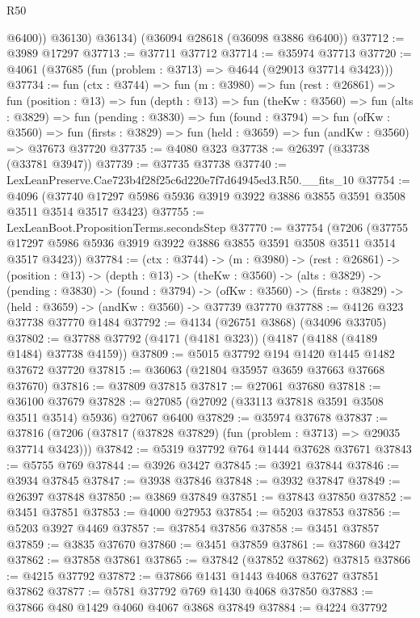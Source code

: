 \begin{lexlean}{R50}
\begin{coremodule}
            @6400))
        @36130)
      @36134)
    (@36094 @28618 (@36098 @3886 @6400))
@37712 := @3989 @17297
@37713 := @37711 @37712
@37714 := @35974 @37713
@37720 := @4061 (@37685 (fun (problem : @3713) => @4644 (@29013 @37714 @3423)))
@37734 := fun (ctx : @3744) =>
  fun (m : @3980) =>
  fun (rest : @26861) =>
  fun (position : @13) =>
  fun (depth : @13) =>
  fun (theKw : @3560) =>
  fun (alts : @3829) =>
  fun (pending : @3830) =>
  fun (found : @3794) =>
  fun (ofKw : @3560) =>
  fun (firsts : @3829) => fun (held : @3659) => fun (andKw : @3560) => @37673 @37720
@37735 := @4080 @323
@37738 := @26397 (@33738 (@33781 @3947))
@37739 := @37735 @37738
@37740 := LexLeanPreserve.Cae723b4f28f25c6d220e7f7d64945ed3.R50.__fits_10
@37754 := @4096
    (@37740 @17297 @5986 @5936 @3919 @3922 @3886 @3855 @3591 @3508 @3511 @3514 @3517 @3423)
@37755 := LexLeanBoot.PropositionTerms.secondsStep
@37770 := @37754
    (@7206 (@37755 @17297 @5986 @5936 @3919 @3922 @3886 @3855 @3591 @3508 @3511 @3514 @3517 @3423))
@37784 := (ctx : @3744) ->
  (m : @3980) ->
  (rest : @26861) ->
  (position : @13) ->
  (depth : @13) ->
  (theKw : @3560) ->
  (alts : @3829) ->
  (pending : @3830) ->
  (found : @3794) ->
  (ofKw : @3560) -> (firsts : @3829) -> (held : @3659) -> (andKw : @3560) -> @37739 @37770
@37788 := @4126 @323 @37738 @37770 @1484
@37792 := @4134 (@26751 @3868) (@34096 @33705)
@37802 := @37788 @37792 (@4171 (@4181 @323)) (@4187 (@4188 (@4189 @1484) @37738 @4159))
@37809 := @5015 @37792 @194 @1420 @1445 @1482 @37672 @37720
@37815 := @36063 (@21804 @35957 @3659 @37663 @37668 @37670)
@37816 := @37809 @37815
@37817 := @27061 @37680
@37818 := @36100 @37679
@37828 := @27085 (@27092 (@33113 @37818 @3591 @3508 @3511 @3514) @5936) @27067 @6400
@37829 := @35974 @37678
@37837 := @37816 (@7206 (@37817 (@37828 @37829) (fun (problem : @3713) => @29035 @37714 @3423)))
@37842 := @5319 @37792 @764 @1444 @37628 @37671
@37843 := @5755 @769
@37844 := @3926 @3427
@37845 := @3921 @37844
@37846 := @3934 @37845
@37847 := @3938 @37846
@37848 := @3932 @37847
@37849 := @26397 @37848
@37850 := @3869 @37849
@37851 := @37843 @37850
@37852 := @3451 @37851
@37853 := @4000 @27953
@37854 := @5203 @37853
@37856 := @5203 @3927 @4469
@37857 := @37854 @37856
@37858 := @3451 @37857
@37859 := @3835 @37670
@37860 := @3451 @37859
@37861 := @37860 @3427
@37862 := @37858 @37861
@37865 := @37842 (@37852 @37862) @37815
@37866 := @4215 @37792
@37872 := @37866 @1431 @1443 @4068 @37627 @37851 @37862
@37877 := @5781 @37792 @769 @1430 @4068 @37850
@37883 := @37866 @480 @1429 @4060 @4067 @3868 @37849
@37884 := @4224 @37792

\end{coremodule}
\end{lexlean}
